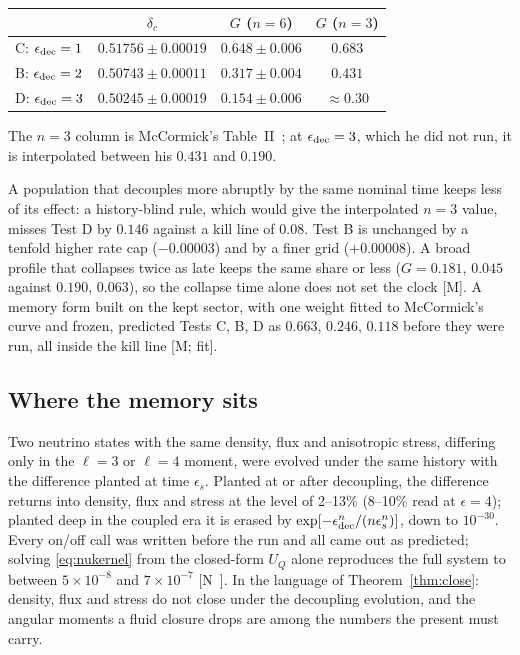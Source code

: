 \documentclass[11pt]{article}
\theoremstyle{definition}
\newcommand{\grade}[1]{\textsf{\small[#1]}}
\begin{document}
\begin{center}\begin{tabular}{lccc}\toprule
& $\delta_c$ & $G$ ($n=6$) & $G$ ($n=3$)\\\midrule
C: $\epsilon_{\rm dec}=1$ & $0.51756\pm0.00019$ & $0.648\pm0.006$ & $0.683$\\
B: $\epsilon_{\rm dec}=2$ & $0.50743\pm0.00011$ & $0.317\pm0.004$ & $0.431$\\
D: $\epsilon_{\rm dec}=3$ & $0.50245\pm0.00019$ & $0.154\pm0.006$ & $\approx0.30$\\\bottomrule
\end{tabular}\end{center}

\noindent The $n=3$ column is McCormick's Table~II~\cite{McC}; at $\epsilon_{\rm dec}=3$, which he did not run, it is interpolated between his $0.431$ and $0.190$.

A population that decouples more abruptly by the same nominal time keeps less of its effect: a history-blind rule, which would give the interpolated $n=3$ value, misses Test D by $0.146$ against a kill line of $0.08$. Test B is unchanged by a tenfold higher rate cap ($-0.00003$) and by a finer grid ($+0.00008$). A broad profile that collapses twice as late keeps the same share or less ($G=0.181$, $0.045$ against $0.190$, $0.063$), so the collapse time alone does not set the clock \grade{M}. A memory form built on the kept sector, with one weight fitted to McCormick's curve and frozen, predicted Tests C, B, D as $0.663$, $0.246$, $0.118$ before they were run, all inside the kill line \grade{M; fit}.

\subsection{Where the memory sits}\label{sec:where}

Two neutrino states with the same density, flux and anisotropic stress, differing only in the $\ell=3$ or $\ell=4$ moment, were evolved under the same history with the difference planted at time $\epsilon_s$. Planted at or after decoupling, the difference returns into density, flux and stress at the level of 2--13\% (8--10\% read at $\epsilon=4$); planted deep in the coupled era it is erased by $\exp[-\epsilon_{\rm dec}^n/(n\epsilon_s^n)]$, down to $10^{-30}$. Every on/off call was written before the run and all came out as predicted; solving \eqref{eq:nukernel} from the closed-form $U_Q$ alone reproduces the full system to between $5\times10^{-8}$ and $7\times10^{-7}$ \grade{N~\cite{NL}}. In the language of Theorem~\ref{thm:close}: density, flux and stress do not close under the decoupling evolution, and the angular moments a fluid closure drops are among the numbers the present must carry.
\end{document}
